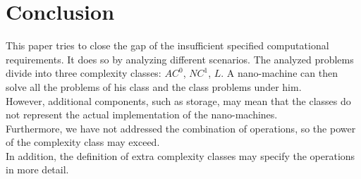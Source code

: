 \documentclass[10pt,sigconf]{acmart}
\begin{document}
\section{Conclusion}
This paper tries to close the gap of the insufficient specified computational requirements.
It does so by analyzing different scenarios. 
The analyzed problems divide into three complexity classes: $AC^0$, $NC^1$, $L$.
A nano-machine can then solve all the problems of his class and the class problems under him.\\
However, additional components, such as storage, may mean that the classes do not represent the actual implementation of the nano-machines.\\
Furthermore, we have not addressed the combination of operations, so the power of the complexity class may exceed.\\
In addition, the definition of extra complexity classes may specify the operations in more detail.








 
\end{document}
